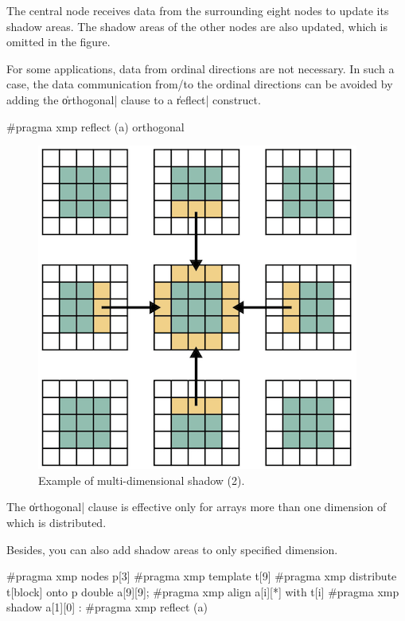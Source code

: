 The central node receives data from the surrounding eight
nodes to update its shadow areas. The shadow areas of the other nodes
are also updated, which is omitted in the figure.

For some applications, data from ordinal directions are not
necessary. In such a case, the data communication from/to the ordinal
directions can be avoided by adding the \|orthogonal| clause to a
\|reflect| construct.

\begin{XCexample}
#pragma xmp reflect (a) orthogonal
\end{XCexample}


\begin{figure}
  \centering
  \includegraphics{figs/multi_orthogonal.png}
  \caption{Example of multi-dimensional shadow (2).}
\end{figure}

\begin{mynote}
  The \|orthogonal| clause is effective only for arrays
  more than one dimension of which is distributed.
\end{mynote}

Besides, you can also add shadow areas to only specified dimension.

\begin{XCexample}
#pragma xmp nodes p[3]
#pragma xmp template t[9]
#pragma xmp distribute t[block] onto p
double a[9][9];
#pragma xmp align a[i][*] with t[i]
#pragma xmp shadow a[1][0]
  :
#pragma xmp reflect (a)
\end{XCexample}

